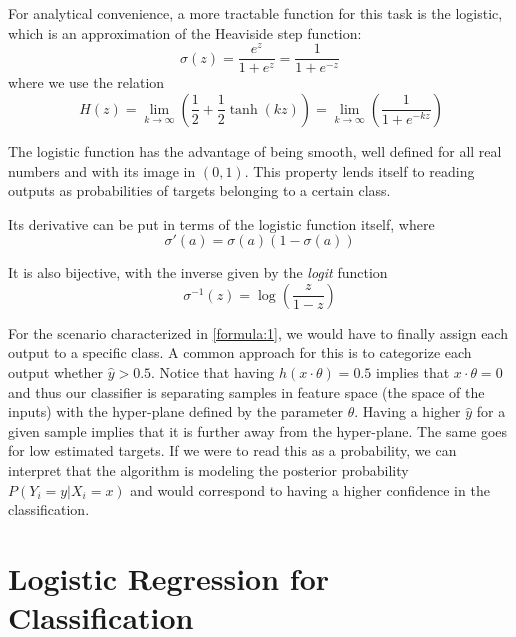 For analytical convenience, a more tractable function for this task is the logistic, which is an approximation of the Heaviside step function:
\begin{equation}\label{eq:logisticFunction}
\sigma(z) = \frac{e^{z}}{1 + e^{z}} = \frac{1}{1 + e^{-z}}
\end{equation}
where we use the relation
\begin{equation}
 \ H(z) = \lim_{k \to \infty} \left(\frac{1}{2} + \frac{1}{2}\tanh(kz) \right) = \lim_{k \to \infty} \left(\frac{1}{1+e^{-kz}} \right)
\end{equation}

The logistic function has the advantage of being smooth, well defined for all real numbers and with its image in $(0,1)$.
This property lends itself to reading outputs as probabilities of targets belonging to a certain class.

Its derivative can be put in terms of the logistic function itself, where
\begin{equation}\label{eq:derivativeLogisticFunction}
\sigma '(a) = \sigma(a)( 1 - \sigma(a) )
\end{equation}

It is also bijective, with the inverse given by the \textit{logit} function
\begin{equation}\label{eq:logitFunction}
\sigma^{-1}(z) = \log \left( \frac{z}{1 - z} \right)
\end{equation}

For the scenario characterized in \cref{formula:1}, we would have to finally assign each output to a specific class.
A common approach for this is to categorize each output whether $\hat{y} > 0.5$\label{formula:logitThreshold}.
Notice that having $h(x \cdot \theta) = 0.5$ implies that $x \cdot \theta = 0$ and thus our classifier is separating samples in feature space (the space of the inputs) with the hyper-plane defined by the parameter $\theta$.
Having a higher $\hat{y}$ for a given sample implies that it is further away from the hyper-plane.
The same goes for low estimated targets.
If we were to read this as a probability, we can interpret that the algorithm is modeling the posterior probability $P(Y_i = y | X_i = x)$ and would correspond to having a higher confidence in the classification.




\section{Logistic Regression for Classification}\label{section-logisticRegression}

